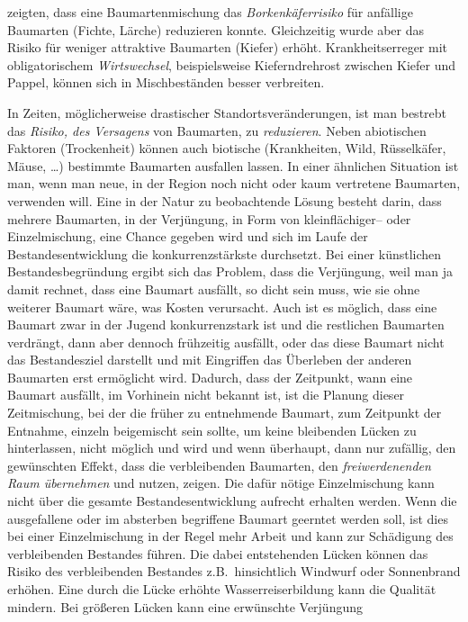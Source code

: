 \documentclass[twocolumn]{scrartcl}
\begin{document}
\cite{sylvie2021mischwaldInsekten} zeigten, dass eine
Baumartenmischung das \emph{Borkenkäferrisiko} für anfällige Baumarten
(Fichte, Lärche) reduzieren konnte. Gleichzeitig wurde aber das Risiko
für weniger attraktive Baumarten (Kiefer) erhöht. Krankheitserreger
mit obligatorischem \emph{Wirtswechsel}, beispielsweise
Kieferndrehrost zwischen Kiefer und Pappel, können sich in
Mischbeständen besser verbreiten.

In Zeiten, möglicherweise drastischer Standortsveränderungen, ist man
bestrebt das \emph{Risiko, des Versagens} von Baumarten, zu
\emph{reduzieren}. Neben abiotischen Faktoren (Trockenheit) können
auch biotische (Krankheiten, Wild, Rüsselkäfer, Mäuse, \dots)
bestimmte Baumarten ausfallen lassen. In einer ähnlichen Situation ist
man, wenn man neue, in der Region noch nicht oder kaum vertretene
Baumarten, verwenden will. Eine in der Natur zu beobachtende Lösung
besteht darin, dass mehrere Baumarten, in der Verjüngung, in Form von
kleinflächiger-- oder Einzelmischung, eine Chance gegeben wird und
sich im Laufe der Bestandesentwicklung die konkurrenzstärkste
durchsetzt. Bei einer künstlichen Bestandesbegründung ergibt sich das
Problem, dass die Verjüngung, weil man ja damit rechnet, dass eine
Baumart ausfällt, so dicht sein muss, wie sie ohne weiterer Baumart
wäre, was Kosten verursacht. Auch ist es möglich, dass eine Baumart
zwar in der Jugend konkurrenzstark ist und die restlichen Baumarten
verdrängt, dann aber dennoch frühzeitig ausfällt, oder das diese
Baumart nicht das Bestandesziel darstellt und mit Eingriffen das
Überleben der anderen Baumarten erst ermöglicht wird. Dadurch, dass
der Zeitpunkt, wann eine Baumart ausfällt, im Vorhinein nicht bekannt
ist, ist die Planung dieser Zeitmischung, bei der die früher zu
entnehmende Baumart, zum Zeitpunkt der Entnahme, einzeln beigemischt
sein sollte, um keine bleibenden Lücken zu hinterlassen, nicht möglich
und wird und wenn überhaupt, dann nur zufällig, den gewünschten
Effekt, dass die verbleibenden Baumarten, den \emph{freiwerdenenden
  Raum übernehmen} und nutzen, zeigen. Die dafür nötige Einzelmischung
kann nicht über die gesamte Bestandesentwicklung aufrecht erhalten
werden. Wenn die ausgefallene oder im absterben begriffene Baumart
geerntet werden soll, ist dies bei einer Einzelmischung in der Regel
mehr Arbeit und kann zur Schädigung des verbleibenden Bestandes
führen. Die dabei entstehenden Lücken können das Risiko des
verbleibenden Bestandes z.B.\ hinsichtlich Windwurf oder Sonnenbrand
erhöhen. Eine durch die Lücke erhöhte Wasserreiserbildung kann die
Qualität mindern. Bei größeren Lücken kann eine erwünschte Verjüngung
\end{document}
